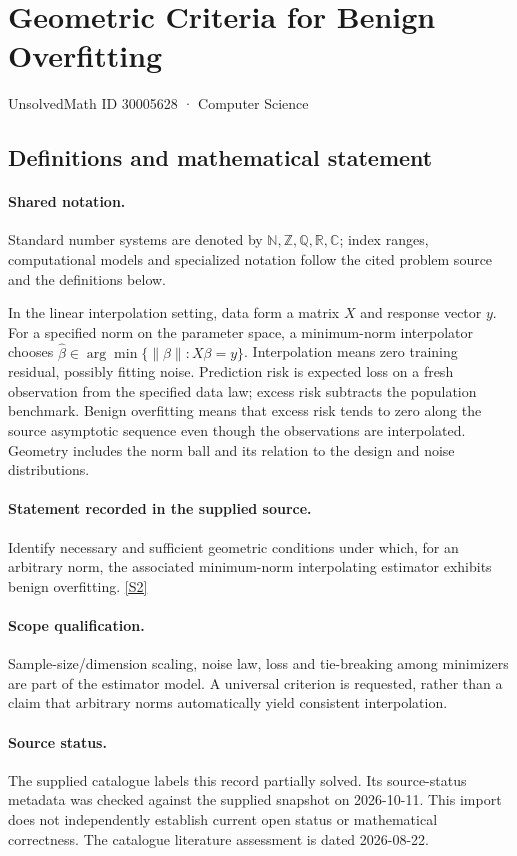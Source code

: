 \documentclass[11pt]{article}
\newcommand{\sref}[2]{\hyperlink{source:#1:#2}{[S#2]}}
\begin{document}
\setcounter{section}{30005627}
\section{Geometric Criteria for Benign Overfitting}\label{30005628}
{\small\sffamily UnsolvedMath ID 30005628 · Computer Science}
\subsection{Definitions and mathematical statement}

\paragraph{Shared notation.}Standard number systems are denoted by $\mathbb N,\mathbb Z,\mathbb Q,\mathbb R,\mathbb C$; index ranges, computational models and specialized notation follow the cited problem source and the definitions below.


In the linear interpolation setting, data form a matrix $X$ and response vector $y$. For a specified norm on the parameter space, a minimum-norm interpolator chooses $\widehat\beta\in\arg\min\{\lVert\beta\rVert:X\beta=y\}$. Interpolation means zero training residual, possibly fitting noise. Prediction risk is expected loss on a fresh observation from the specified data law; excess risk subtracts the population benchmark. Benign overfitting means that excess risk tends to zero along the source asymptotic sequence even though the observations are interpolated. Geometry includes the norm ball and its relation to the design and noise distributions.
\paragraph{Statement recorded in the supplied source.}
Identify necessary and sufficient geometric conditions under which, for an arbitrary norm, the associated minimum-norm interpolating estimator exhibits benign overfitting. \sref{30005628}{2}
\paragraph{Scope qualification.}
Sample-size/dimension scaling, noise law, loss and tie-breaking among minimizers are part of the estimator model. A universal criterion is requested, rather than a claim that arbitrary norms automatically yield consistent interpolation.
\paragraph{Source status.}
The supplied catalogue labels this record partially solved. Its source-status metadata was checked against the supplied snapshot on 2026-10-11. This import does not independently establish current open status or mathematical correctness. The catalogue literature assessment is dated 2026-08-22.
\end{document}

